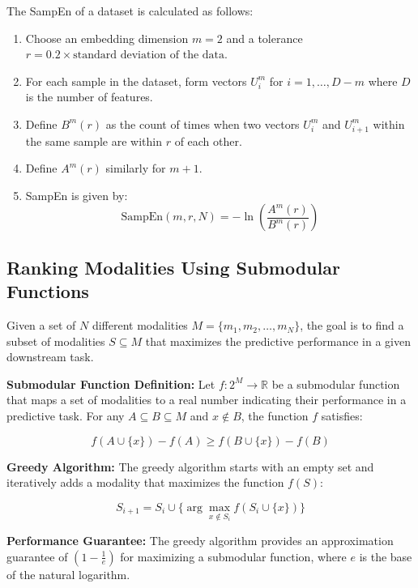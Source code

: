 \documentclass{article} %
\begin{document}
The SampEn of a dataset is calculated as follows:
\begin{enumerate}
    \item Choose an embedding dimension \( m = 2 \) and a tolerance \( r = 0.2 \times \text{standard deviation of the data} \).
    \item For each sample in the dataset, form vectors \( U^m_i \) for \( i = 1, \ldots, D-m \) where \( D \) is the number of features.
    \item Define \( B^m(r) \) as the count of times when two vectors \( U^m_i \) and \( U^m_{i+1} \) within the same sample are within \( r \) of each other.
    \item Define \( A^m(r) \) similarly for \( m+1 \).
    \item SampEn is given by:
    \[ \text{SampEn}(m, r, N) = -\ln\left(\frac{A^m(r)}{B^m(r)}\right) \]
\end{enumerate}



\clearpage
\subsection{Ranking Modalities Using Submodular Functions}

Given a set of \( N \) different modalities \( M = \{m_1, m_2, \ldots, m_N\} \), the goal is to find a subset of modalities \( S \subseteq M \) that maximizes the predictive performance in a given downstream task.

\textbf{Submodular Function Definition:} Let \( f: 2^M \rightarrow \mathbb{R} \) be a submodular function that maps a set of modalities to a real number indicating their performance in a predictive task. For any \( A \subseteq B \subseteq M \) and \( x \notin B \), the function \( f \) satisfies:

\[ f(A \cup \{x\}) - f(A) \geq f(B \cup \{x\}) - f(B) \]

\textbf{Greedy Algorithm:} The greedy algorithm starts with an empty set and iteratively adds a modality that maximizes the function \( f(S) \):

\[ S_{i+1} = S_i \cup \{\arg\max_{x \notin S_i} f(S_i \cup \{x\})\} \]


\textbf{Performance Guarantee:} The greedy algorithm provides an approximation guarantee of \( (1 - \frac{1}{e}) \) for maximizing a submodular function, where \( e \) is the base of the natural logarithm.

\end{document}
